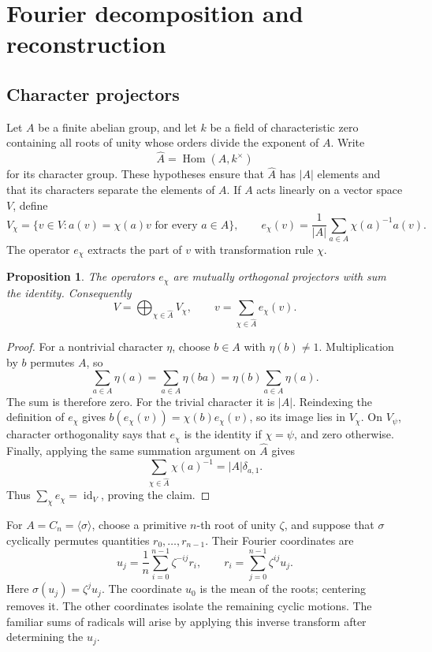 \documentclass[11pt]{article}
\newtheorem{proposition}{Proposition}[section]
\theoremstyle{remark}
\begin{document}
\section{Fourier decomposition and reconstruction}
\label{fourier:section}

\subsection{Character projectors}

Let \(A\) be a finite abelian group, and let \(k\) be a field of characteristic zero containing all roots of unity whose orders divide the exponent of \(A\). Write
\[
\widehat A=\operatorname{Hom}(A,k^\times)
\]
for its character group. These hypotheses ensure that \(\widehat A\) has \(|A|\) elements and that its characters separate the elements of \(A\). If \(A\) acts linearly on a vector space \(V\), define
\[
V_\chi=\{v\in V:a(v)=\chi(a)v\text{ for every }a\in A\},
\qquad
e_\chi(v)=\frac{1}{|A|}\sum_{a\in A}\chi(a)^{-1}a(v).
\]
The operator \(e_\chi\) extracts the part of \(v\) with transformation rule \(\chi\).

\begin{proposition}
\label{fourier:projectors}
The operators \(e_\chi\) are mutually orthogonal projectors with sum the identity. Consequently
\[
V=\bigoplus_{\chi\in\widehat A}V_\chi,
\qquad
v=\sum_{\chi\in\widehat A}e_\chi(v).
\]
\end{proposition}

\begin{proof}
For a nontrivial character \(\eta\), choose \(b\in A\) with \(\eta(b)\ne1\). Multiplication by \(b\) permutes \(A\), so
\[
\sum_{a\in A}\eta(a)=\sum_{a\in A}\eta(ba)
=\eta(b)\sum_{a\in A}\eta(a).
\]
The sum is therefore zero. For the trivial character it is \(|A|\). Reindexing the definition of \(e_\chi\) gives
\(b(e_\chi(v))=\chi(b)e_\chi(v)\), so its image lies in \(V_\chi\). On \(V_\psi\), character orthogonality says that \(e_\chi\) is the identity if \(\chi=\psi\), and zero otherwise. Finally, applying the same summation argument on \(\widehat A\) gives
\[
\sum_{\chi\in\widehat A}\chi(a)^{-1}=|A|\delta_{a,1}.
\]
Thus \(\sum_\chi e_\chi=\operatorname{id}_V\), proving the claim.
\end{proof}

For \(A=C_n=\langle\sigma\rangle\), choose a primitive \(n\)-th root of unity \(\zeta\), and suppose that \(\sigma\) cyclically permutes quantities \(r_0,\ldots,r_{n-1}\). Their Fourier coordinates are
\[
u_j=\frac1n\sum_{i=0}^{n-1}\zeta^{-ij}r_i,
\qquad
r_i=\sum_{j=0}^{n-1}\zeta^{ij}u_j.
\]
Here \(\sigma(u_j)=\zeta^ju_j\). The coordinate \(u_0\) is the mean of the roots; centering removes it. The other coordinates isolate the remaining cyclic motions. The familiar sums of radicals will arise by applying this inverse transform after determining the \(u_j\).
\end{document}
